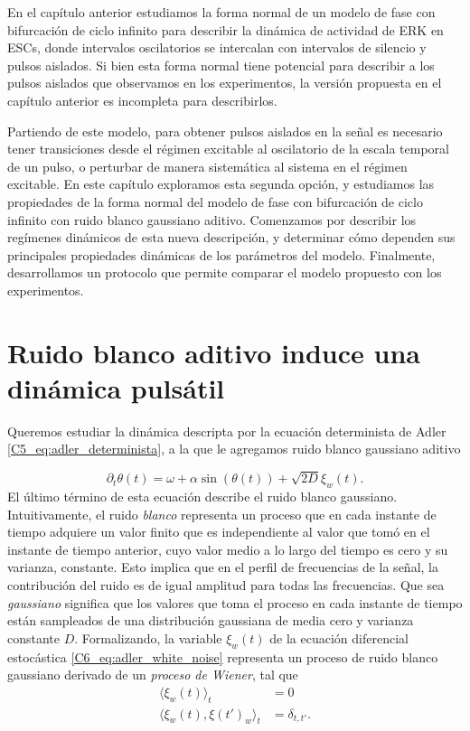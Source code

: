 \documentclass[./main.tex]{subfiles}
\begin{document}
En el capítulo anterior estudiamos la forma normal de un modelo de fase con bifurcación de ciclo infinito para describir la dinámica de actividad de ERK en ESCs, donde intervalos oscilatorios se intercalan con intervalos de silencio y pulsos aislados. Si bien esta forma normal tiene potencial para describir a los pulsos aislados que observamos en los experimentos, la versión propuesta en el capítulo anterior es incompleta para describirlos. 


Partiendo de este modelo, para obtener pulsos aislados en la señal es necesario tener transiciones desde el régimen excitable al oscilatorio de la escala temporal de un pulso, o perturbar de manera sistemática al sistema en el régimen excitable. En este capítulo exploramos esta segunda opción, y estudiamos las propiedades de la forma normal del modelo de fase con bifurcación de ciclo infinito con ruido blanco gaussiano aditivo. Comenzamos por describir los regímenes dinámicos de esta nueva descripción, y determinar cómo dependen sus principales propiedades dinámicas de los parámetros del modelo. Finalmente, desarrollamos un protocolo que permite comparar el modelo propuesto con los experimentos.


\section{Ruido blanco aditivo induce una dinámica pulsátil}

Queremos estudiar la dinámica descripta por la ecuación determinista de Adler \ref{C5_eq:adler_determinista}, a la que le agregamos ruido blanco gaussiano aditivo 

\begin{equation}
    \partial_t  \theta(t) = \omega + \alpha \sin{(\theta(t))} + \sqrt{2D} \xi_w(t).
    \label{C6_eq:adler_white_noise}
\end{equation}
El último término de esta ecuación describe el ruido blanco gaussiano. Intuitivamente, el ruido \emph{blanco} representa un proceso que en cada instante de tiempo adquiere un valor finito que es independiente al valor que tomó en el instante de tiempo anterior, cuyo valor medio a lo largo del tiempo es cero y su varianza, constante. Esto implica que en el perfil de frecuencias de la señal, la contribución del ruido es de igual amplitud para todas las frecuencias. Que sea \emph{gaussiano} significa que los valores que toma el proceso en cada instante de tiempo están sampleados de una distribución gaussiana de media cero y varianza constante $D$. Formalizando, la variable $\xi_w(t)$ de la ecuación diferencial estocástica \ref{C6_eq:adler_white_noise} representa un proceso de ruido blanco gaussiano derivado de un \emph{proceso de Wiener}, tal que \cite{SanMiguel2000}
\begin{align}
    \langle \xi_w(t) \rangle_{t} & = 0 \label{C6_eq:wiener_mean}\\
    \langle \xi_w(t),\xi(t')_w \rangle_{t} & = \delta_{t,t'}. \label{C6_eq:wiener_cov}
\end{align}
\end{document}
